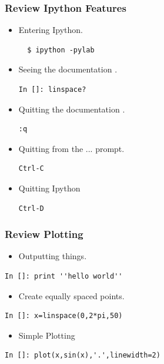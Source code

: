 \documentclass[14pt,compress]{beamer}
\newcounter{time}
\newcommand{\inctime}[1]{\addtocounter{time}{#1}{\tiny \thetime\ m}}
\begin{document}






\begin{frame}[fragile]
\frametitle{Review Ipython Features }
\vspace{-0.1in}
\begin{itemize}
\item Entering Ipython.
\begin{verbatim}
  $ ipython -pylab  
\end{verbatim}
\item Seeing the documentation . 
\begin{lstlisting}
In []: linspace?
\end{lstlisting}
\item Quitting the documentation .
\begin{lstlisting}
:q 
\end{lstlisting}
\item Quitting from the ... prompt.
\begin{lstlisting}
Ctrl-C
\end{lstlisting}
\end{itemize}
\begin{itemize}
\item Quitting Ipython
\begin{lstlisting}
Ctrl-D
\end{lstlisting}
\end{itemize}


\end{frame}

\begin{frame}[fragile]
\frametitle{Review Plotting }
\vspace{-0.15in}
\begin{itemize}
\item Outputting things.
\end{itemize}
\begin{lstlisting}
In []: print ''hello world'' 
\end{lstlisting}
\begin{itemize}
\item Create equally spaced points.
\end{itemize}
\begin{lstlisting}
In []: x=linspace(0,2*pi,50)
\end{lstlisting}
\begin{itemize}
\item Simple Plotting
\end{itemize}
\begin{lstlisting}
In []: plot(x,sin(x),'.',linewidth=2)
\end{lstlisting}
\end{frame}
\end{document}
